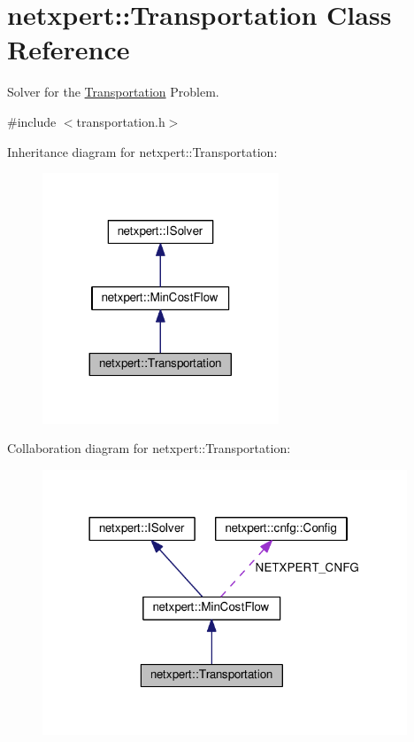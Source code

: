 \hypertarget{classnetxpert_1_1Transportation}{}\section{netxpert\+:\+:Transportation Class Reference}
\label{classnetxpert_1_1Transportation}


Solver for the \hyperlink{classnetxpert_1_1Transportation}{Transportation} Problem.  




{\ttfamily \#include $<$transportation.\+h$>$}



Inheritance diagram for netxpert\+:\+:Transportation\+:\nopagebreak
\begin{figure}[H]
\begin{center}
\leavevmode
\includegraphics[width=200pt]{classnetxpert_1_1Transportation__inherit__graph}
\end{center}
\end{figure}


Collaboration diagram for netxpert\+:\+:Transportation\+:\nopagebreak
\begin{figure}[H]
\begin{center}
\leavevmode
\includegraphics[width=309pt]{classnetxpert_1_1Transportation__coll__graph}
\end{center}
\end{figure}
